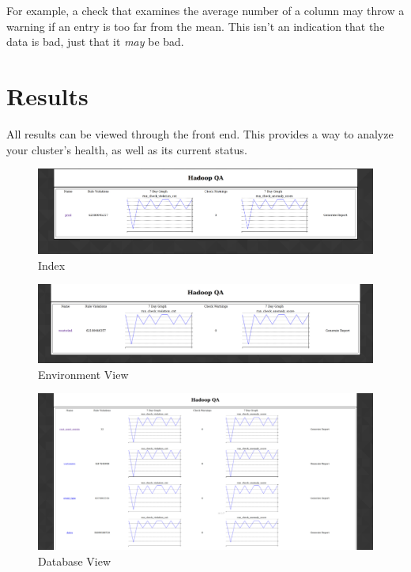     For example, a check that examines the average number of a column may throw a warning if an entry is too far from the
    mean. This isn't an indication that the data is bad, just that it \textit{may} be bad.

\section{Results}
All results can be viewed through the front end. This provides a way to analyze your cluster's health, as well as its
current status.

\begin{figure}[H]
    \centering
    \includegraphics[scale=0.2]{./img/index.png}
    \caption{Index}
\end{figure}

\begin{figure}[H]
    \centering
    \includegraphics[scale=0.2]{./img/prod.png}
    \caption{Environment View}
\end{figure}

\begin{figure}[H]
    \centering
    \includegraphics[scale=0.2]{./img/westwind.png}
    \caption{Database View}
\end{figure}
